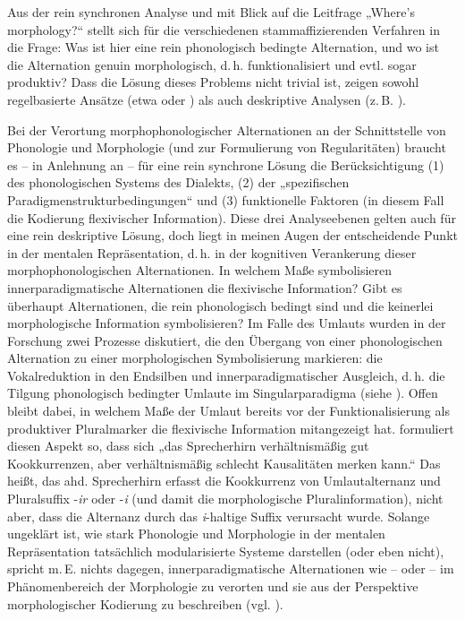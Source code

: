 Aus der rein synchronen Analyse und mit Blick auf die Leitfrage „Where’s morphology?“ stellt sich für die verschiedenen stammaffizierenden Verfahren in 	 die Frage: Was ist hier eine rein phonologisch bedingte Alternation, und wo ist die Alternation genuin morphologisch, d.\,h. funktionalisiert und evtl. sogar produktiv? Dass die Lösung dieses Problems nicht trivial ist, zeigen sowohl regelbasierte Ansätze (etwa \citealt{Seiler2008} oder \citealt{Harnisch2016}) als auch deskriptive Analysen (z.\,B. \citealt{Birkenes2014}).

Bei der Verortung morphophonologischer Alternationen an der Schnittstelle von Phonologie und Morphologie (und zur Formulierung von Regularitäten) braucht es -- in Anlehnung an \citet[97--98]{Harnisch2016} -- für eine rein synchrone Lösung die Berücksichtigung (1) des phonologischen Systems des Dialekts, (2) der „spezifischen Paradigmenstrukturbedingungen“ und (3) funktionelle Faktoren (in diesem Fall die Kodierung flexivischer Information). Diese drei Analyseebenen gelten auch für eine rein deskriptive Lösung, doch liegt in meinen Augen der entscheidende Punkt in der mentalen Repräsentation, d.\,h. in der kognitiven Verankerung dieser morphophonologischen Alternationen. In welchem Maße symbolisieren innerparadigmatische Alternationen die flexivische Information? Gibt es überhaupt Alternationen, die rein phonologisch bedingt sind und die keinerlei morphologische Information symbolisieren? Im Falle des Umlauts wurden in der Forschung zwei Prozesse diskutiert, die den Übergang von einer phonologischen Alternation zu einer morphologischen Symbolisierung markieren: die Vokalreduktion in den Endsilben und innerparadigmatischer Ausgleich, d.\,h. die Tilgung phonologisch bedingter Umlaute im Singularparadigma (siehe ). Offen bleibt dabei, in welchem Maße der Umlaut bereits vor der Funktionalisierung als produktiver Pluralmarker die flexivische Information mitangezeigt hat. \citet[196]{Seiler2008} formuliert diesen Aspekt so, dass sich „das Sprecherhirn verhältnismäßig gut Kookkurrenzen, aber verhältnismäßig schlecht Kausalitäten merken kann.“ Das heißt, das ahd. Sprecherhirn erfasst die Kookkurrenz von Umlautalternanz und Pluralsuffix -\textit{ir} oder -\textit{i} (und damit die morphologische Pluralinformation), nicht aber, dass die Alternanz durch das \textit{i}{}-haltige Suffix verursacht wurde. Solange ungeklärt ist, wie stark Phonologie und Morphologie in der mentalen Repräsentation tatsächlich modularisierte Systeme darstellen (oder eben nicht), spricht m.\,E. nichts dagegen, innerparadigmatische Alternationen wie  --  oder  --  im Phänomenbereich der Morphologie zu verorten und sie aus der Perspektive morphologischer Kodierung zu beschreiben (vgl. \citealt[35]{Rowley1997}).

